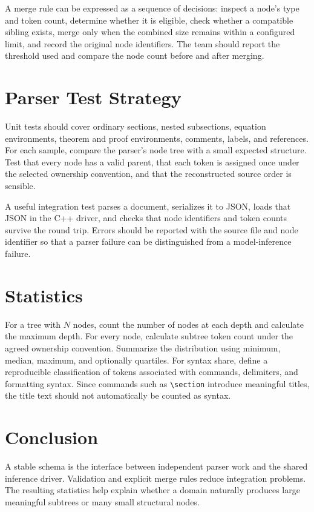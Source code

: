 \documentclass{article}
\begin{document}
A merge rule can be expressed as a sequence of decisions: inspect a node's type and token count, determine whether it is eligible, check whether a compatible sibling exists, merge only when the combined size remains within a configured limit, and record the original node identifiers. The team should report the threshold used and compare the node count before and after merging.

\section{Parser Test Strategy}
Unit tests should cover ordinary sections, nested subsections, equation environments, theorem and proof environments, comments, labels, and references. For each sample, compare the parser's node tree with a small expected structure. Test that every node has a valid parent, that each token is assigned once under the selected ownership convention, and that the reconstructed source order is sensible.

A useful integration test parses a document, serializes it to JSON, loads that JSON in the C++ driver, and checks that node identifiers and token counts survive the round trip. Errors should be reported with the source file and node identifier so that a parser failure can be distinguished from a model-inference failure.

\section{Statistics}
For a tree with $N$ nodes, count the number of nodes at each depth and calculate the maximum depth. For every node, calculate subtree token count under the agreed ownership convention. Summarize the distribution using minimum, median, maximum, and optionally quartiles. For syntax share, define a reproducible classification of tokens associated with commands, delimiters, and formatting syntax. Since commands such as \verb|\section| introduce meaningful titles, the title text should not automatically be counted as syntax.

\section{Conclusion}
A stable schema is the interface between independent parser work and the shared inference driver. Validation and explicit merge rules reduce integration problems. The resulting statistics help explain whether a domain naturally produces large meaningful subtrees or many small structural nodes.
\end{document}
